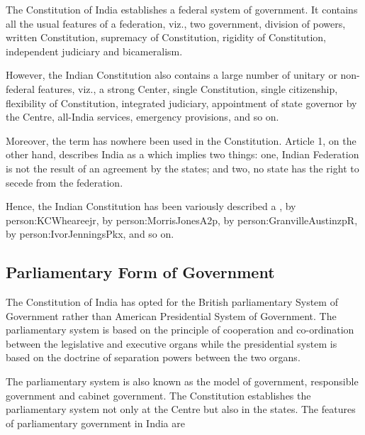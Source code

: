 The Constitution of India establishes a federal system of government. It contains all the usual features of a federation, viz., two government, division of powers, written Constitution, supremacy of Constitution, rigidity of Constitution, independent judiciary and bicameralism.

However, the Indian Constitution also contains a large number of unitary or non-federal features, viz., a strong Center, single Constitution, single citizenship, flexibility of Constitution, integrated judiciary, appointment of state governor by the Centre, all-India services, emergency provisions, and so on.

Moreover, the term  has nowhere been used in the Constitution. Article 1, on the other hand, describes India as a  which implies two things: one, Indian Federation is not the result of an agreement by the states; and two, no state has the right to secede from the federation.

Hence, the Indian Constitution has been variously described a ,  by \gls{person:KCWheareejr},  by \gls{person:MorrisJonesA2p},  by \gls{person:GranvilleAustinzpR},  by \gls{person:IvorJenningsPkx}, and so on.

\subsection{Parliamentary Form of Government}

The Constitution of India has opted for the British parliamentary System of Government rather than American Presidential System of Government. The parliamentary system is based on the principle of cooperation and co-ordination between the legislative and executive organs while the presidential system is based on the doctrine of separation powers between the two organs.

The parliamentary system is also known as the  model of government, responsible government and cabinet government. The Constitution establishes the parliamentary system not only at the Centre but also in the states. The features of parliamentary government in India are


